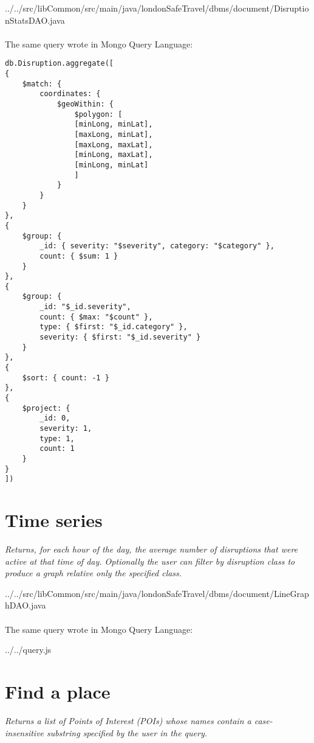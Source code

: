 
{../../src/libCommon/src/main/java/londonSafeTravel/dbms/document/DisruptionStatsDAO.java}

\paragraph{}
The same query wrote in Mongo Query Language:

\begin{lstlisting}
db.Disruption.aggregate([
{
	$match: {
		coordinates: {
			$geoWithin: {
				$polygon: [
				[minLong, minLat],
				[maxLong, minLat],
				[maxLong, maxLat],
				[minLong, maxLat],
				[minLong, minLat]
				]
			}
		}
	}
},
{
	$group: {
		_id: { severity: "$severity", category: "$category" },
		count: { $sum: 1 }
	}
},
{
	$group: {
		_id: "$_id.severity",
		count: { $max: "$count" },
		type: { $first: "$_id.category" },
		severity: { $first: "$_id.severity" }
	}
},
{
	$sort: { count: -1 }
},
{
	$project: {
		_id: 0,
		severity: 1,
		type: 1,
		count: 1
	}
}
])
\end{lstlisting}

\section{Time series}
\textit{Returns, for each hour of the day, the average number of disruptions that were active at that time of day. Optionally the user can filter by disruption class to produce a graph relative only the specified class.}


{../../src/libCommon/src/main/java/londonSafeTravel/dbms/document/LineGraphDAO.java}

\paragraph{}
The same query wrote in Mongo Query Language:

{../../query.js}


\section{Find a place}
\textit{Returns a list of Points of Interest (POIs) whose names contain a case-insensitive substring specified by the user in the query.}


